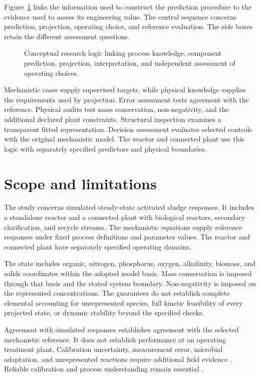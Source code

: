 Figure~\ref{fig:research_conceptual_logic} links the information used to construct the prediction procedure to the evidence used to assess its engineering value. The central sequence concerns prediction, projection, operating choice, and reference evaluation. The side boxes retain the different assessment questions.

\begin{figure}[htbp]
\centering

\caption{Conceptual research logic linking process knowledge, component prediction, projection, interpretation, and independent assessment of operating choices.}
\label{fig:research_conceptual_logic}
\end{figure}

Mechanistic cases supply supervised targets, while physical knowledge supplies the requirements used by projection. Error assessment tests agreement with the reference. Physical audits test mass conservation, non-negativity, and the additional declared plant constraints. Structural inspection examines a transparent fitted representation. Decision assessment evaluates selected controls with the original mechanistic model. The reactor and connected plant use this logic with separately specified predictors and physical boundaries.

\section{Scope and limitations}

The study concerns simulated steady-state activated sludge responses. It includes a standalone reactor and a connected plant with biological reactors, secondary clarification, and recycle streams. The mechanistic equations supply reference responses under fixed process definitions and parameter values. The reactor and connected plant have separately specified operating domains.

The state includes organic, nitrogen, phosphorus, oxygen, alkalinity, biomass, and solids coordinates within the adopted model basis. Mass conservation is imposed through that basis and the stated system boundary. Non-negativity is imposed on the represented concentrations. The guarantees do not establish complete elemental accounting for unrepresented species, full kinetic feasibility of every projected state, or dynamic stability beyond the specified checks.

Agreement with simulated responses establishes agreement with the selected mechanistic reference. It does not establish performance at an operating treatment plant. Calibration uncertainty, measurement error, microbial adaptation, and unrepresented reactions require additional field evidence \citep{Machado2014,Newhart2019}. Reliable calibration and process understanding remain essential \citep{Petersen2003,Meijer2004}.

